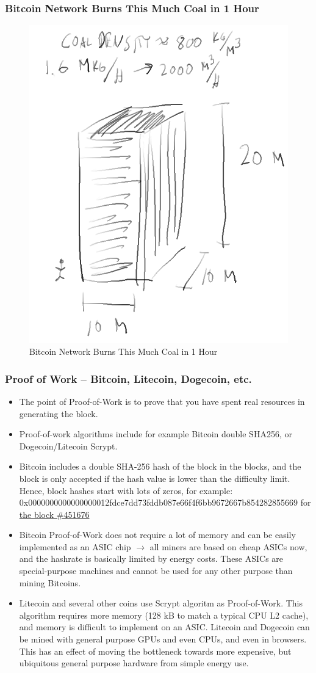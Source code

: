 \documentclass[8pt]{beamer}
\begin{document}
\begin{frame}
\frametitle{Bitcoin Network Burns This Much Coal in 1 Hour}

\begin{figure}[tb]
 \centering
 \includegraphics[width=5 cm,keepaspectratio=true]{./blockchain_images/coal.png}
 \caption{Bitcoin Network Burns This Much Coal in 1 Hour}
\end{figure}

\end{frame}

\begin{frame}
\frametitle{Proof of Work – Bitcoin, Litecoin, Dogecoin, etc.}

\begin{itemize}
 \item The point of Proof-of-Work is to prove that you have spent real resources in generating the block.
 \item Proof-of-work algorithms include for example Bitcoin double SHA256, or Dogecoin/Litecoin Scrypt.
 \item Bitcoin includes a double SHA-256 hash of the block in the blocks, and the block is only accepted if the hash value is lower than the difficulty limit. Hence, block hashes start with lots of zeros, for example:
       0x0000000000000000012fdce7dd73fddb087e66f4f6bb9672667b854282855669 for \href{https://blockexplorer.com/block/0000000000000000012fdce7dd73fddb087e66f4f6bb9672667b854282855669}{the block \#451676}
 \item Bitcoin Proof-of-Work does not require a lot of memory and can be easily implemented as an ASIC chip $ \rightarrow $ all miners are based on cheap ASICs now, and the hashrate is basically limited by energy costs.
       These ASICs are special-purpose machines and cannot be used for any other purpose than mining Bitcoins.
 \item Litecoin and several other coins use Scrypt algoritm as Proof-of-Work. This algorithm requires more memory (128 kB to match a typical CPU L2 cache), and memory is difficult to implement on an ASIC.
       Litecoin and Dogecoin can be mined with general purpose GPUs and even CPUs, and even in browsers. This has an effect of moving the bottleneck towards more expensive, but ubiquitous general purpose hardware
       from simple energy use.
\end{itemize}
\end{frame}
\end{document}

